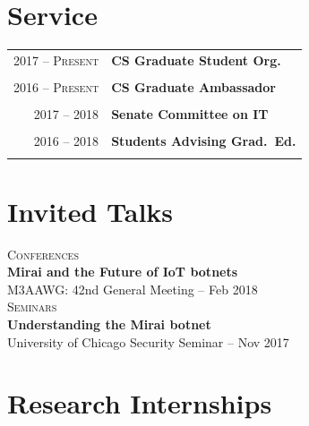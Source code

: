 \documentclass[10pt]{article} %
\begin{document}
{\begin{minipage}[t]{0.44\textwidth}
\section{Service} 

\begin{tabular}{rl}
2017 -- \textsc{Present} & \textbf{CS Graduate Student Org.}\\
& \\

2016 -- \textsc{Present} & \textbf{CS Graduate Ambassador}\\
& \\

2017 -- 2018 & \textbf{Senate Committee on IT} \\
& \\


2016 -- 2018 & \textbf{Students Advising Grad.\ Ed.}\\
& \\


\end{tabular}


\section{Invited Talks} 

\textsc{Conferences}\\
\hspace*{15pt} \textbf{Mirai and the Future of IoT botnets}\\
\hspace*{15pt} M3AAWG: 42nd General Meeting -- Feb 2018 \\

\textsc{Seminars}\\
\hspace*{15pt} \textbf{Understanding the Mirai botnet} \\
\hspace*{15pt} University of Chicago Security Seminar -- Nov 2017 \\


\section{Research Internships} 


\end{minipage}}
\end{document}
